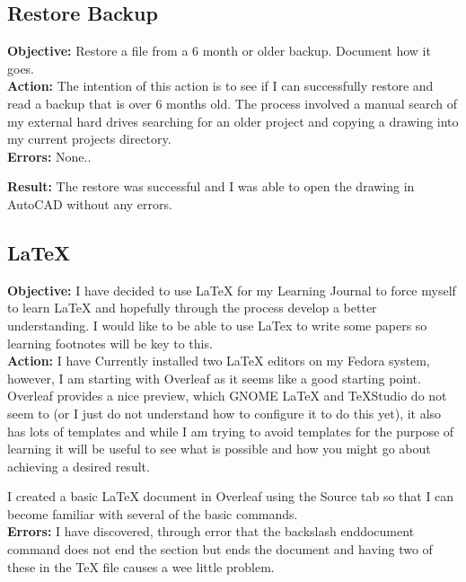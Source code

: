 \documentclass[a4paper,11pt]{article}
\begin{document}
\subsection{Restore Backup}

\noindent \textbf{Objective:} Restore a file from a 6 month or older backup. Document how it goes.\\

\noindent \textbf{Action:}  The intention of this action is to see if I can successfully restore and read a backup that is over 6 months old. The process involved a manual search of my external hard drives searching for an older project and copying a drawing into my current projects directory.\\

\noindent \textbf{Errors:} None.. 

\noindent \textbf{Result:} The restore was successful and I was able to open the drawing in AutoCAD without any errors.

\subsection{LaTeX}

\noindent \textbf{Objective:} I have decided to use LaTeX for my Learning Journal to force myself to learn LaTeX and hopefully through the process develop a better understanding. I would like to be able to use LaTex to write some papers so learning footnotes will be key to this.\\ 

\noindent \textbf{Action:} I have Currently installed two LaTeX editors on my Fedora system, however, I am starting with Overleaf as it seems like a good starting point. Overleaf provides a nice preview, which GNOME LaTeX and TeXStudio do not seem to (or I just do not understand how to configure it to do this yet), it also has lots of templates and while I am trying to avoid templates for the purpose of learning it will be useful to see what is possible and how you might go about achieving a desired result.

I created a basic LaTeX document in Overleaf using the Source tab so that I can become familiar with several of the basic commands.\\

\noindent \textbf{Errors:} I have discovered, through error that the backslash end{document} command does not end the section but ends the document and having two of these in the TeX file causes a wee little problem.\\  
\end{document}

